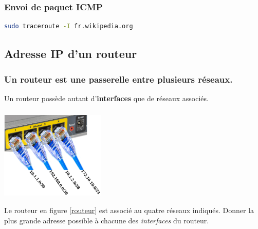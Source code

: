 \documentclass[svgnames,11pt]{beamer}
\begin{document}
\begin{frame}[fragile]
    \frametitle{Envoi de paquet ICMP}

    \begin{center}
        \begin{lstlisting}[language=bash]
sudo traceroute -I fr.wikipedia.org        
        \end{lstlisting}
        \label{moncode}
    \end{center}

\end{frame}
\subsection{Adresse IP d'un routeur}
\begin{frame}
    \frametitle{Un routeur est une \textbf{passerelle} entre plusieurs réseaux.}
    
    \begin{aretenir}[]
        Un routeur possède autant d'\textbf{interfaces} que de réseaux associés.
    \end{aretenir}
\end{frame}

\begin{frame}
    \frametitle{}

    \begin{center}
        \centering
        \includegraphics[width=5cm]{ressources/routeur-adresses.png}
        \label{routeur}
    \end{center}
    \begin{activite}
    Le routeur en figure \ref{routeur} est associé au quatre réseaux indiqués. Donner la plus grande adresse possible à chacune des \emph{interfaces} du routeur.
    \end{activite}

\end{frame}
\end{document}
